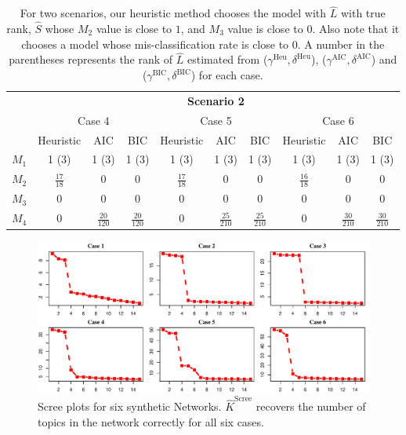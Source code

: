 \documentclass[AMS,STIX1COL]{WileyNJD-v2}
\begin{document}
{\begin{enumerate}
\begin{table}[htbp]
    \begin{tabular}{c|ccc|ccc|ccc}
                & \multicolumn{9}{c}{\textbf{Scenario 2}}                                              \\
                \cline{2-10}
                & \multicolumn{3}{c|}{Case 4} & \multicolumn{3}{c|}{Case 5} & \multicolumn{3}{c}{Case 6} \\
                \cline{2-10}
                & Heuristic   & AIC   & BIC  &    Heuristic   & AIC   & BIC  & Heuristic   & AIC   & BIC  \\
                \hline
    $M_{1}$   &   1 (3)     &     1 (3)  &  1 (3)    &      1 (3)   &   1 (3)    &  1 (3)    &   1 (3)     &  1 (3)   & 1 (3)   \\
    $M_{2}$   &   $\frac{17}{18}$   &   0    &    0  &   $\frac{17}{18}$     &   0    &  0    &  $\frac{16}{18}$    &   0    &  0    \\
    $M_{3}$   &   0 &     0  &   0   &        0     &    0   &  0    &        0     &   0    & 0 \\
    $M_{4}$   &  0  &   $\frac{20}{120}$    &  $\frac{20}{120}$    &   0          &   $\frac{25}{210}$    &   $\frac{25}{210}$   &  0      &  $\frac{30}{210}$     &   $\frac{30}{210}$   \\
                \hline
    \end{tabular}
    \caption{ For two scenarios, our heuristic method chooses the model with $\widehat{L}$ with true rank, $\widehat{S}$ whose $M_2$ value is close to $1$, and $M_3$ value is close to $0$.
    Also note that it chooses a model whose mis-classification rate is close to $0$.
    A number in the parentheses represents the rank of $\widehat{L}$ estimated from ($\gamma^{\text{Heu}},\delta^{\text{Heu}}$), ($\gamma^{\text{AIC}},\delta^{\text{AIC}}$) and ($\gamma^{\text{BIC}},\delta^{\text{BIC}}$) for each case.}
    \label{tab:table1}
    \end{table}

    \begin{figure}[htbp]
        \includegraphics[width=1\textwidth]{Fig2.pdf}
        \caption{ Scree plots for six synthetic Networks.
        $\hat{K}^{\mbox{Scree}}$ recovers the number of topics in the network correctly for all six cases.}
        \label{fig:figure2}
    \end{figure}


\end{enumerate}}
\end{document}
